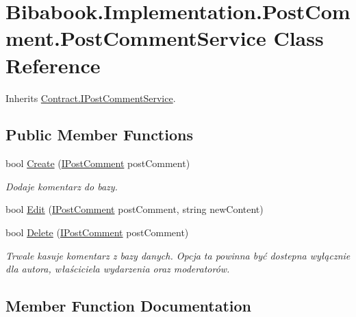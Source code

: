 \hypertarget{class_bibabook_1_1_implementation_1_1_post_comment_1_1_post_comment_service}{}\section{Bibabook.\+Implementation.\+Post\+Comment.\+Post\+Comment\+Service Class Reference}
\label{class_bibabook_1_1_implementation_1_1_post_comment_1_1_post_comment_service}


Inherits \hyperlink{interface_contract_1_1_i_post_comment_service}{Contract.\+I\+Post\+Comment\+Service}.

\subsection*{Public Member Functions}
\begin{DoxyCompactItemize}
\item 
bool \hyperlink{class_bibabook_1_1_implementation_1_1_post_comment_1_1_post_comment_service_a69d9cb1bd34cc3470638e13307962227}{Create} (\hyperlink{interface_contract_1_1_i_post_comment}{I\+Post\+Comment} post\+Comment)
\begin{DoxyCompactList}\small\item\em Dodaje komentarz do bazy. \end{DoxyCompactList}\item 
bool \hyperlink{class_bibabook_1_1_implementation_1_1_post_comment_1_1_post_comment_service_a894fd3d726779a8b47086614ab9ac502}{Edit} (\hyperlink{interface_contract_1_1_i_post_comment}{I\+Post\+Comment} post\+Comment, string new\+Content)
\item 
bool \hyperlink{class_bibabook_1_1_implementation_1_1_post_comment_1_1_post_comment_service_a00809b1cd328b7a733e48d3df9cebd30}{Delete} (\hyperlink{interface_contract_1_1_i_post_comment}{I\+Post\+Comment} post\+Comment)
\begin{DoxyCompactList}\small\item\em Trwale kasuje komentarz z bazy danych. Opcja ta powinna być dostepna wyłącznie dla autora, właściciela wydarzenia oraz moderatorów. \end{DoxyCompactList}\end{DoxyCompactItemize}


\subsection{Member Function Documentation}
\hypertarget{class_bibabook_1_1_implementation_1_1_post_comment_1_1_post_comment_service_a69d9cb1bd34cc3470638e13307962227}{}
